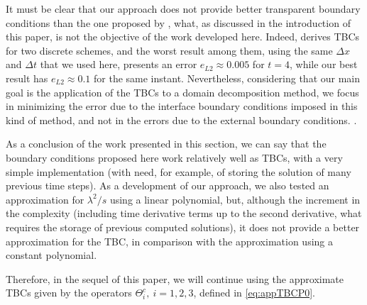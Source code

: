 \indent It must be clear that our approach does not provide better transparent boundary conditions than the one proposed by \cite{besse2015}, what, as discussed in the introduction of this paper, is not the objective of the work developed here. Indeed, \cite{besse2015} derives TBCs for two discrete schemes, and the worst result among them, using the same $\Delta x $ and $\Delta t$ that we used here, presents an error $e_{L2} \approx 0.005$ for $t = 4$, while our best result has $e_{L2} \approx 0.1$ for the same instant. Nevertheless, considering that our main goal is the application of the TBCs to a domain decomposition method, we focus in minimizing the error due to the interface boundary conditions imposed in this kind of method, and not in the errors due to the external boundary conditions. .

\indent As a conclusion of the work presented in this section, we can say that the boundary conditions proposed here work relatively well as TBCs, with a very simple implementation (with need, for example, of storing the solution of many previous time steps). As a development of our approach, we also tested an approximation for $\lambda^2/s$ using a linear polynomial, but, although the increment in the complexity (including time derivative terms up to the second derivative, what requires the storage of previous computed solutions), it does not provide a better approximation for the TBC, in comparison with the approximation using a constant polynomial.

\indent Therefore, in the sequel of this paper, we will continue using the approximate TBCs given by the operators $\Theta_i^{c}, \ i=1,2,3$, defined in \eqref{eq:appTBCP0}.